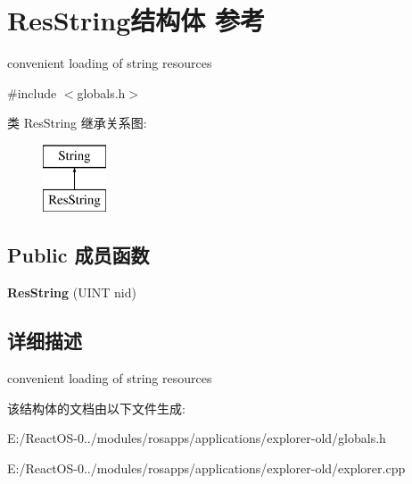 \hypertarget{struct_res_string}{}\section{Res\+String结构体 参考}
\label{struct_res_string}


convenient loading of string resources  




{\ttfamily \#include $<$globals.\+h$>$}

类 Res\+String 继承关系图\+:\begin{figure}[H]
\begin{center}
\leavevmode
\includegraphics[height=2.000000cm]{struct_res_string}
\end{center}
\end{figure}
\subsection*{Public 成员函数}
\begin{DoxyCompactItemize}
\item 
\mbox{\label{struct_res_string_a819e1f8ced0a55650f471da5c73d08e9}} 
{\bfseries Res\+String} (U\+I\+NT nid)
\end{DoxyCompactItemize}


\subsection{详细描述}
convenient loading of string resources 

该结构体的文档由以下文件生成\+:\begin{DoxyCompactItemize}
\item 
E\+:/\+React\+O\+S-\/0../modules/rosapps/applications/explorer-\/old/globals.\+h\item 
E\+:/\+React\+O\+S-\/0../modules/rosapps/applications/explorer-\/old/explorer.\+cpp\end{DoxyCompactItemize}
